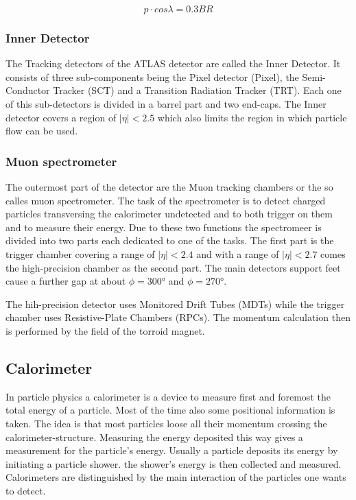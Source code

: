 \begin{equation}
p \cdot cos \lambda = 0.3 BR
\end{equation}


\subsubsection{Inner Detector}

The Tracking detectors of the ATLAS detector are called the Inner Detector. It consists of three sub-components being the Pixel detector (Pixel), the Semi-Conductor Tracker (SCT) and a Transition Radiation Tracker (TRT). Each one of this sub-detectors is divided in a barrel part and two end-caps. The Inner detector covers a region of $|\eta| < 2.5$ which also limits the region in which particle flow can be used.

\subsubsection{Muon spectrometer}

The outermost part of the detector are the Muon tracking chambers or the so calles muon spectrometer. The task of the spectrometer is to detect charged particles transversing the calorimeter undetected and to both trigger on them and to measure their energy. Due to these two functions the spectromeer is divided into two parts each dedicated to one of the tasks. The first part is the trigger chamber covering a range of $|\eta|<2.4$ and with a range of $|\eta|<2.7$ comes the high-precision chamber as the second part. The main detectors support feet cause a further gap at about $\phi = \ang{300}$ and $\phi = \ang{270}$. 

The hih-precision detector uses Monitored Drift Tubes (MDTs) while the trigger chamber uses Resistive-Plate Chambers (RPCs). The momentum calculation then is performed by the field of the torroid magnet.



\subsection{Calorimeter}

In particle physics a calorimeter is a device to measure first and foremost the total energy of a particle. Most of the time also some positional information is taken.
The idea is that most particles loose all their momentum crossing the calorimeter-structure. Measuring the energy deposited this way gives a measurement for the particle's energy.
Usually a particle deposits its energy by initiating a particle shower. the shower's energy is then collected and measured.
Calorimeters are distinguished by the main interaction of the particles one wants to detect. 

